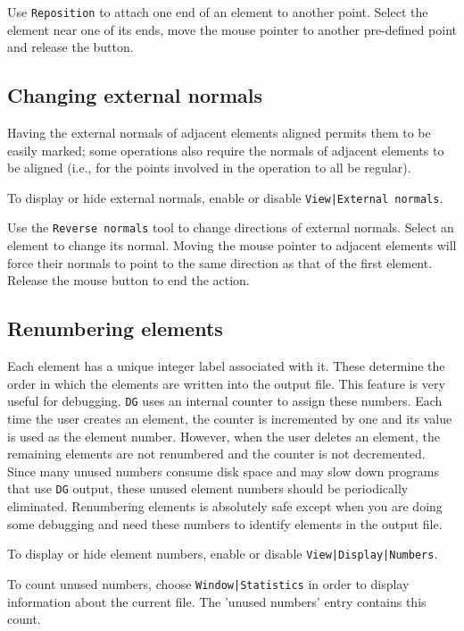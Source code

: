 \documentclass[a4paper,10pt]{report}
\begin{document}
Use {\tt Reposition} to attach one end of an element to another
point. Select the element near one of its ends, move the mouse
pointer to another pre-defined point and release the button.

\subsection{Changing external normals}

Having the external normals of adjacent elements aligned permits them
to be easily marked; some operations also require the normals of
adjacent elements to be aligned (i.e., for the points involved in the
operation to
all be regular).

To display or hide external normals, enable or disable
{\tt View|External normals}.

Use the {\tt Reverse normals} tool to change directions of external
normals. Select an element to change its normal. Moving the mouse
pointer to adjacent elements will force their normals to point to the
same direction as that of the first element. Release the mouse button
to end the action.

\subsection{Renumbering elements}

Each element has a unique integer label associated with it. These
determine the order in which the elements are written into the output file. This
feature is very useful for debugging. {\tt DG} uses an internal counter to
assign these numbers. Each time the user creates an element, the
counter is incremented by one and its value is used as the element
number. However, when the user deletes an element, the remaining elements are
not renumbered and the counter is not decremented. Since many unused
numbers consume disk space and may slow down programs that use {\tt DG}
output, these unused element numbers should be periodically eliminated. Renumbering elements is
absolutely safe except when you are doing some debugging and need
these numbers to identify elements in the output file.

To display or hide element numbers, enable or disable {\tt View|Display|Numbers}.

To count unused numbers, choose {\tt Window|Statistics} in order to
display information about the current file. The 'unused numbers' entry
contains this count.
\end{document}
